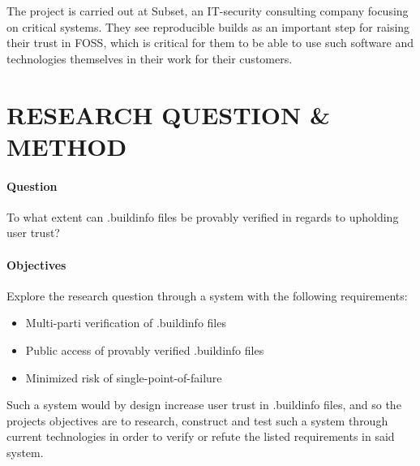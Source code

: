 \documentclass{article}
\begin{document}
The project is carried out at Subset, an IT-security consulting company focusing on critical systems. They see reproducible builds as an important step for raising their trust in FOSS, which is critical for them to be able to use such software and technologies themselves in their work for their customers.





\section*{RESEARCH QUESTION \& METHOD}

\paragraph{Question} To what extent can .buildinfo files be provably verified in regards to upholding user trust?

\paragraph{Objectives} Explore the research question through a system with the following requirements:

\begin{itemize}
	\item Multi-parti verification of .buildinfo files
	\item Public access of provably verified .buildinfo files
	\item Minimized risk of single-point-of-failure
\end{itemize}

Such a system would by design increase user trust in .buildinfo files, and so the projects objectives are to research, construct and test such a system through current technologies in order to verify or refute the listed requirements in said system. 

\end{document}
